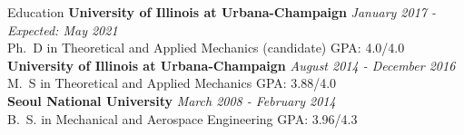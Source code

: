 \documentclass{resume} %
\begin{document}

\begin{rSection}{Education}
{\bf University of Illinois at Urbana-Champaign} \hfill {\em January 2017 - Expected: May 2021} 
\\ Ph.\ D in Theoretical and Applied Mechanics (candidate) \hfill {GPA: 4.0/4.0}\\
{\bf University of Illinois at Urbana-Champaign} \hfill {\em August 2014 - December 2016} 
\\ M.\ S in Theoretical and Applied Mechanics \hfill {GPA: 3.88/4.0}\\
{\bf Seoul National University} \hfill {\em March 2008 - February 2014} 
\\ B.\ S. in Mechanical and Aerospace Engineering \hfill {GPA: 3.96/4.3}
\end{rSection}



\end{document}

